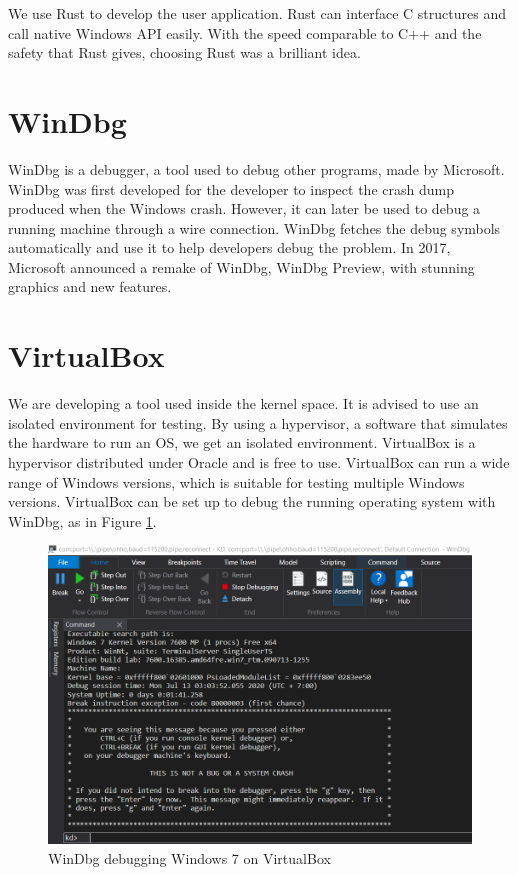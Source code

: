 We use Rust to develop the user application. Rust can interface C structures
and call native Windows API easily. With the speed comparable to C++ and the
safety that Rust gives, choosing Rust was a brilliant idea.

\section[WinDbg]{WinDbg}

WinDbg is a debugger, a tool used to debug other programs, made by Microsoft.
WinDbg was first developed for the developer to inspect the crash dump produced
when the Windows crash. However, it can later be used to debug a running
machine through a wire connection. WinDbg fetches the debug symbols
automatically and use it to help developers debug the problem. In 2017,
Microsoft announced a remake of WinDbg, WinDbg Preview, with stunning graphics
and new features.

\section[VirtualBox]{VirtualBox}

We are developing a tool used inside the kernel space. It is advised to use an
isolated environment for testing. By using a hypervisor, a software that
simulates the hardware to run an OS, we get an isolated environment.
VirtualBox is a hypervisor distributed under Oracle and is free to use.
VirtualBox can run a wide range of Windows versions, which is suitable for
testing multiple Windows versions. VirtualBox can be set up to debug the
running operating system with WinDbg, as in Figure \ref{fig:windbg}.

\begin{figure}[h]
  \centering
  \caption{WinDbg debugging Windows 7 on VirtualBox}
  \label{fig:windbg}
  \includegraphics[scale=0.4]{images/windbg.png}
\end{figure}
